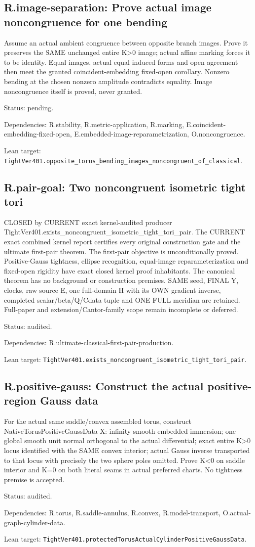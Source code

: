 \documentclass{article}
\begin{document}
\subsection*{R.image-separation: Prove actual image noncongruence for one bending}
Assume an actual ambient congruence between opposite branch images. Prove it preserves the SAME unchanged entire K>0 image; actual affine marking forces it to be identity. Equal images, actual equal induced forms and open agreement then meet the granted coincident-embedding fixed-open corollary. Nonzero bending at the chosen nonzero amplitude contradicts equality. Image noncongruence itself is proved, never granted.
\par Status: pending.
\par Dependencies: R.stability, R.metric-application, R.marking, E.coincident-embedding-fixed-open, E.embedded-image-reparametrization, O.noncongruence.
\par Lean target: \texttt{TightVer401.opposite\_torus\_bending\_images\_noncongruent\_of\_classical}.
\subsection*{R.pair-goal: Two noncongruent isometric tight tori}
CLOSED by CURRENT exact kernel-audited producer TightVer401.exists\_noncongruent\_isometric\_tight\_tori\_pair. The CURRENT exact combined kernel report certifies every original construction gate and the ultimate first-pair theorem. The first-pair objective is unconditionally proved. Positive-Gauss tightness, ellipse recognition, equal-image reparameterization and fixed-open rigidity have exact closed kernel proof inhabitants. The canonical theorem has no background or construction premises. SAME seed, FINAL Y, clocks, raw source E, one full-domain H with its OWN gradient inverse, completed scalar/beta/Q/Cdata tuple and ONE FULL meridian are retained. Full-paper and extension/Cantor-family scope remain incomplete or deferred.
\par Status: audited.
\par Dependencies: R.ultimate-classical-first-pair-production.
\par Lean target: \texttt{TightVer401.exists\_noncongruent\_isometric\_tight\_tori\_pair}.
\subsection*{R.positive-gauss: Construct the actual positive-region Gauss data}
For the actual same saddle/convex assembled torus, construct NativeTorusPositiveGaussData X: infinity smooth embedded immersion; one global smooth unit normal orthogonal to the actual differential; exact entire K>0 locus identified with the SAME convex interior; actual Gauss inverse transported to that locus with precisely the two sphere poles omitted. Prove K<0 on saddle interior and K=0 on both literal seams in actual preferred charts. No tightness premise is accepted.
\par Status: audited.
\par Dependencies: R.torus, R.saddle-annulus, R.convex, R.model-transport, O.actual-graph-cylinder-data.
\par Lean target: \texttt{TightVer401.protectedTorusActualCylinderPositiveGaussData}.
\end{document}
